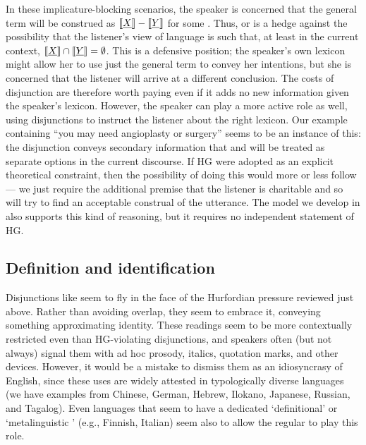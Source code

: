 \documentclass{article}
\begin{document}
In these implicature-blocking scenarios, the speaker is concerned that
the general term  will be construed as
$\llbracket\emph{X}\rrbracket-\llbracket\emph{Y}\rrbracket$ for some . Thus,  or
 is a hedge against the possibility that the listener's view
of language is such that, at least in the current context,
$\llbracket\emph{X}\rrbracket \cap \llbracket\emph{Y}\rrbracket = \emptyset$. This is a defensive
position; the speaker's own lexicon might allow her to use just the
general term to convey her intentions, but she is concerned that the
listener will arrive at a different conclusion. The costs of
disjunction are therefore worth paying even if it adds no new
information given the speaker's lexicon.  However, the speaker can
play a more active role as well, using disjunctions to instruct the
listener about the right lexicon. Our 
example containing ``you may need angioplasty or surgery'' seems to be
an instance of this: the disjunction conveys secondary information
that  and  will be treated as separate
options in the current discourse. If HG were adopted as an explicit
theoretical constraint, then the possibility of doing this would more
or less follow --- we just require the additional premise that the
listener is charitable and so will try to find an acceptable construal
of the utterance. The model we develop in  also
supports this kind of reasoning, but it requires no independent
statement of HG.
 

\subsection{Definition and identification}\label{sec:data:definitional}

Disjunctions like  seem to fly in the
face of the Hurfordian pressure reviewed just above. Rather than
avoiding overlap, they seem to embrace it, conveying something
approximating identity. These readings seem to be more contextually
restricted even than HG-violating disjunctions, and speakers often
(but not always) signal them with ad hoc prosody, italics, quotation
marks, and other devices. However, it would be a mistake to dismiss
them as an idiosyncrasy of English, since these uses are widely
attested in typologically diverse languages (we have examples from
Chinese, German, Hebrew, Ilokano, Japanese, Russian, and
Tagalog). Even languages that seem to have a dedicated `definitional'
or `metalinguistic ' (e.g., Finnish, Italian) seem also to
allow the regular  to play this role.
\end{document}
